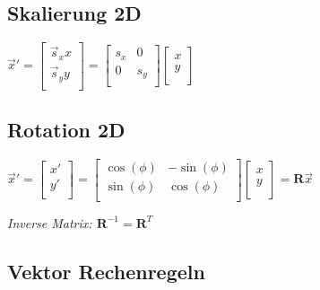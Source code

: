 \subsection{Skalierung 2D}

$\vec{x}' = \begin{bmatrix}
    \vec{s}_x x \\
    \vec{s}_y y \\
\end{bmatrix} = \begin{bmatrix}
    s_x & 0 \\
    0 & s_y \\
\end{bmatrix} \begin{bmatrix}
    x \\
    y \\
\end{bmatrix}$

\subsection{Rotation 2D}

$\vec{x}' = \begin{bmatrix}
    x' \\
    y' \\
\end{bmatrix} = \begin{bmatrix}
    \cos(\phi) & -\sin(\phi) \\
    \sin(\phi) & \cos(\phi) \\
\end{bmatrix} \begin{bmatrix}
    x \\
    y \\
\end{bmatrix} = \mathbf{R}\vec{x}$

\textit{Inverse Matrix: $\mathbf{R}^{-1} = \mathbf{R}^T$}

\subsection{Vektor Rechenregeln}

